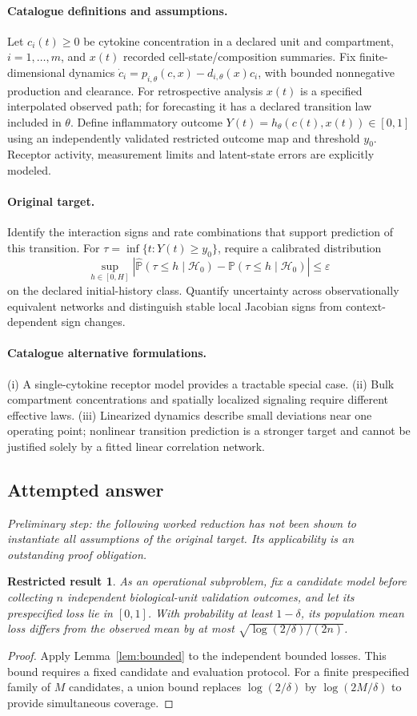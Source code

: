 \documentclass[11pt]{article}
\newcommand{\Prob}{\mathbb P}
\providecommand{\Prob}{\mathbb P}
\newtheorem{attemptresult}{Restricted result}[section]
\begin{document}
\paragraph{Catalogue definitions and assumptions.}
Let $c_i(t)\geq0$ be cytokine concentration in a declared unit and compartment, $i=1,\ldots,m$, and $x(t)$ recorded cell-state/composition summaries. Fix finite-dimensional dynamics $\dot c_i=p_{i,\theta}(c,x)-d_{i,\theta}(x)c_i$, with bounded nonnegative production and clearance. For retrospective analysis $x(t)$ is a specified interpolated observed path; for forecasting it has a declared transition law included in $\theta$. Define inflammatory outcome $Y(t)=h_\theta(c(t),x(t))\in[0,1]$ using an independently validated restricted outcome map and threshold $y_0$. Receptor activity, measurement limits and latent-state errors are explicitly modeled.
\paragraph{Original target.}
Identify the interaction signs and rate combinations that support prediction of this transition. For $\tau=\inf\{t:Y(t)\geq y_0\}$, require a calibrated distribution
    \[\sup_{h\in[0,H]}|\widehat{\Prob}(\tau\leq h\mid\mathcal H_0)-
    \Prob(\tau\leq h\mid\mathcal H_0)|\leq\varepsilon\]
    on the declared initial-history class. Quantify uncertainty across observationally equivalent networks and distinguish stable local Jacobian signs from context-dependent sign changes.
\paragraph{Catalogue alternative formulations.}
(i) A single-cytokine receptor model provides a tractable special case. (ii) Bulk compartment concentrations and spatially localized signaling require different effective laws. (iii) Linearized dynamics describe small deviations near one operating point; nonlinear transition prediction is a stronger target and cannot be justified solely by a fitted linear correlation network.
\subsection{Attempted answer}
\noindent\emph{Preliminary step: the following worked reduction has not been shown to instantiate all assumptions of the original target. Its applicability is an outstanding proof obligation.}

\begin{attemptresult}
As an operational subproblem, fix a candidate model before collecting $n$ independent biological-unit validation outcomes, and let its prespecified loss lie in $[0,1]$. With probability at least $1-\delta$, its population mean loss differs from the observed mean by at most $\sqrt{\log(2/\delta)/(2n)}$.
\end{attemptresult}
\begin{proof}
Apply Lemma~\ref{lem:bounded} to the independent bounded losses. This bound requires a fixed candidate and evaluation protocol. For a finite prespecified family of $M$ candidates, a union bound replaces $\log(2/\delta)$ by $\log(2M/\delta)$ to provide simultaneous coverage.
\end{proof}
\end{document}
